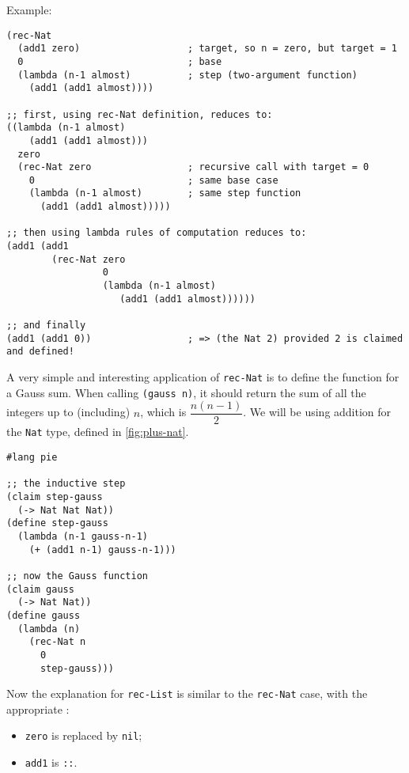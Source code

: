 Example:
{
  \small
\begin{verbatim}
(rec-Nat 
  (add1 zero)                   ; target, so n = zero, but target = 1
  0                             ; base
  (lambda (n-1 almost)          ; step (two-argument function)
    (add1 (add1 almost))))

;; first, using rec-Nat definition, reduces to:
((lambda (n-1 almost)
    (add1 (add1 almost)))
  zero
  (rec-Nat zero                 ; recursive call with target = 0
    0                           ; same base case
    (lambda (n-1 almost)        ; same step function
      (add1 (add1 almost)))))

;; then using lambda rules of computation reduces to:
(add1 (add1
        (rec-Nat zero
                 0
                 (lambda (n-1 almost)
                    (add1 (add1 almost))))))

;; and finally
(add1 (add1 0))                 ; => (the Nat 2) provided 2 is claimed and defined!
\end{verbatim}
}

A very simple and interesting application of \texttt{rec-Nat} is to define
the function for a Gauss sum. When calling \texttt{(gauss n)}, it should
return the sum of all the integers up to (including) $ n $, which is
$ \dfrac{n(n-1)}{2} $. We will be using addition for the \texttt{Nat}
type, defined in \ref{fig:plus-nat}.
{
  \small
\begin{verbatim}
#lang pie

;; the inductive step
(claim step-gauss
  (-> Nat Nat Nat))
(define step-gauss
  (lambda (n-1 gauss-n-1)
    (+ (add1 n-1) gauss-n-1)))

;; now the Gauss function
(claim gauss
  (-> Nat Nat))
(define gauss
  (lambda (n)
    (rec-Nat n
      0
      step-gauss)))
\end{verbatim}
}

\vspace{0.3cm}
Now the explanation for \texttt{rec-List} is similar to the \texttt{rec-Nat} case,
with the appropriate :
\begin{itemize}
\item \texttt{zero} is replaced by \texttt{nil};
\item \texttt{add1} is \texttt{::}.
\end{itemize}

